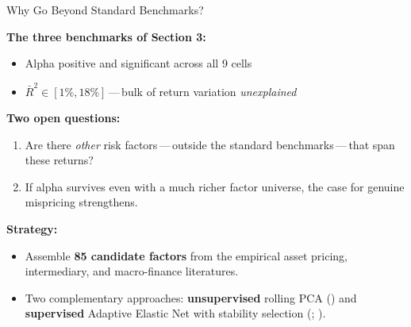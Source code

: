 \documentclass[aspectratio=169,11pt]{beamer}
\newcommand{\hlt}[1]{\textcolor{edhecred}{\textbf{#1}}}     %
\newcommand{\hltb}[1]{\textcolor{accentblue}{\textbf{#1}}}  %
\begin{document}
\begin{frame}[t]{Why Go Beyond Standard Benchmarks?}
\small

\textbf{The three benchmarks of Section 3:}
\begin{itemize}\itemsep=0.05cm
  \item Alpha positive and significant across all 9 cells
  \item \hlt{$\bar R^2 \in [1\%, 18\%]$}\,---\,bulk of return variation \emph{unexplained}
\end{itemize}

\vspace{0.40cm}

\textbf{Two open questions:}
\begin{enumerate}\itemsep=0.10cm
  \item Are there \emph{other} risk factors\,---\,outside the standard
        benchmarks\,---\,that span these returns?
  \item If alpha survives even with a much richer factor universe, the case for genuine
        mispricing strengthens.
\end{enumerate}

\vspace{0.40cm}

\textbf{Strategy:}
\begin{itemize}\itemsep=0.05cm
  \item Assemble \hlt{85 candidate factors} from the empirical asset pricing,
        intermediary, and macro-finance literatures.
  \item Two complementary approaches: \hltb{unsupervised} rolling PCA
        (\citealp{ludvigson2009macro}) and \hltb{supervised} Adaptive Elastic Net
        with stability selection (\citealp{zou2009adaptive}; \citealp{meinshausen2010stability}).
\end{itemize}

\end{frame}
\end{document}
